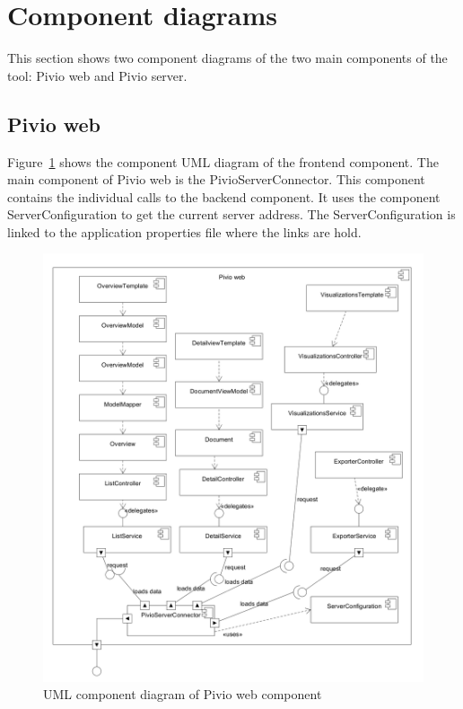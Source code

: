\section{Component diagrams}

This section shows two component diagrams of the two main components of the tool: Pivio web and Pivio server.

\subsection{Pivio web}

Figure~\ref{fig:pivioweb-component} shows the component UML diagram of the frontend component. The main component of Pivio web is the PivioServerConnector. This component contains the individual calls to the backend component. It uses the component ServerConfiguration to get the current server address. The ServerConfiguration is linked to the application properties file where the links are hold.

\begin{figure}[htpb]
  \centering
  \includegraphics[width=1.0\textwidth]{figures/Pivioweb-ComponentDiagram.PNG}
  \caption{UML component diagram of Pivio web component}
  \label{fig:pivioweb-component}
\end{figure}

